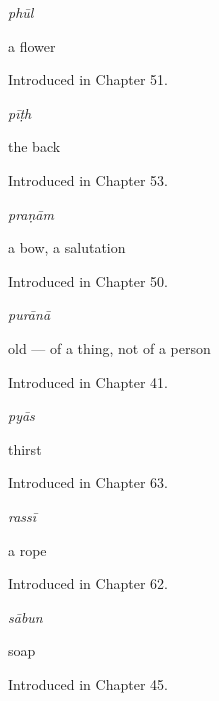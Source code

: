 \noindent\begin{minipage}[t]{\linewidth}
\raggedright
\textbf{}\enspace\emph{phūl}\par
\small a flower\par
\footnotesize Introduced in Chapter 51.
\end{minipage}\par\medskip

\noindent\begin{minipage}[t]{\linewidth}
\raggedright
\textbf{}\enspace\emph{pīṭh}\par
\small the back\par
\footnotesize Introduced in Chapter 53.
\end{minipage}\par\medskip

\noindent\begin{minipage}[t]{\linewidth}
\raggedright
\textbf{}\enspace\emph{praṇām}\par
\small a bow, a salutation\par
\footnotesize Introduced in Chapter 50.
\end{minipage}\par\medskip

\noindent\begin{minipage}[t]{\linewidth}
\raggedright
\textbf{}\enspace\emph{purānā}\par
\small old — of a thing, not of a person\par
\footnotesize Introduced in Chapter 41.
\end{minipage}\par\medskip

\noindent\begin{minipage}[t]{\linewidth}
\raggedright
\textbf{}\enspace\emph{pyās}\par
\small thirst\par
\footnotesize Introduced in Chapter 63.
\end{minipage}\par\medskip

\noindent\begin{minipage}[t]{\linewidth}
\raggedright
\textbf{}\enspace\emph{rassī}\par
\small a rope\par
\footnotesize Introduced in Chapter 62.
\end{minipage}\par\medskip

\noindent\begin{minipage}[t]{\linewidth}
\raggedright
\textbf{}\enspace\emph{sābun}\par
\small soap\par
\footnotesize Introduced in Chapter 45.
\end{minipage}\par\medskip

